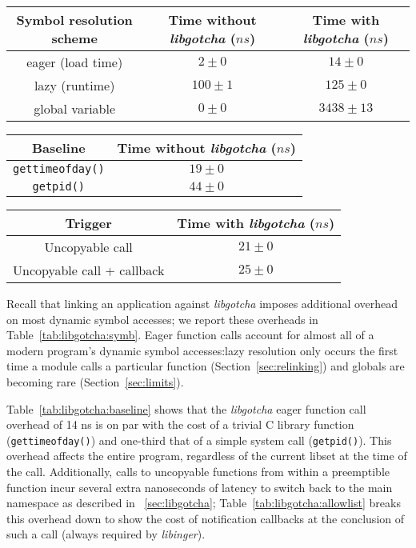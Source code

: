 \begin{table*}
	\begin{minipage}{\textwidth}
	\centering
	\begin{tabular}{c | c c}
	Symbol resolution scheme & Time without \textit{libgotcha} ($ns$) & Time with \textit{libgotcha} ($ns$) \\
	\hline
	eager (load time) & $2 \pm 0$ & $14 \pm 0$ \\
	lazy (runtime) & $100 \pm 1$ & $125 \pm 0$ \\
	global variable & $0 \pm 0$ & $3438 \pm 13$
	\end{tabular}
	\label{tab:libgotcha:symb}
	\end{minipage}

	\begin{minipage}{\columnwidth}
	\centering
	\begin{tabular}{c | c}
	Baseline & Time without \textit{libgotcha} ($ns$) \\
	\hline
	\texttt{gettimeofday()} & $19 \pm 0$ \\
	\texttt{getpid()} & $44 \pm 0$
	\end{tabular}
	\label{tab:libgotcha:baseline}
	\end{minipage}
%
	\begin{minipage}{\columnwidth}
	\centering
	\begin{tabular}{c | c}
	Trigger & Time with \textit{libgotcha} ($ns$) \\
	\hline
	Uncopyable call & $21 \pm 0$ \\
	Uncopyable call + callback & $25 \pm 0$
	\end{tabular}
	\label{tab:libgotcha:allowlist}
	\end{minipage}
\caption{Runtime overheads of accessing dynamic symbols}
\end{table*}

Recall that linking an application against \textit{libgotcha} imposes additional
overhead on most dynamic symbol accesses; we report these overheads in
Table~\ref{tab:libgotcha:symb}.  Eager function calls account for almost all of a
modern program's dynamic symbol accesses:\@ lazy resolution only occurs the first
time a module calls a particular function (Section~\ref{sec:relinking}) and globals
are becoming rare (Section~\ref{sec:limits}).

Table~\ref{tab:libgotcha:baseline} shows that the \textit{libgotcha} eager function
call overhead of 14 ns is on par with the cost of a trivial C library function
(\texttt{gettimeofday()}) and one-third
that of a simple system call (\texttt{getpid()}).  This overhead affects the entire
program, regardless of the
current libset at the time of the call.  Additionally, calls to
uncopyable functions from within a preemptible function incur several extra
nanoseconds of latency to switch back to the main namespace as described in
\Chap~\ref{sec:libgotcha}; Table~\ref{tab:libgotcha:allowlist} breaks this overhead
down to
show the cost of notification callbacks at the conclusion of such a call (always
required by \textit{libinger}).
